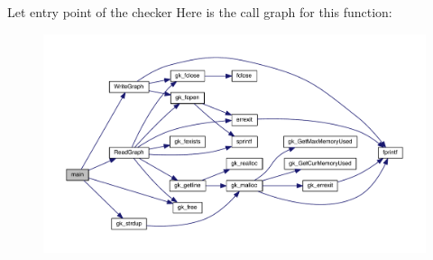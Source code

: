 Let entry point of the checker Here is the call graph for this function\+:\nopagebreak
\begin{figure}[H]
\begin{center}
\leavevmode
\includegraphics[width=350pt]{a00314_a0ddf1224851353fc92bfbff6f499fa97_cgraph}
\end{center}
\end{figure}
